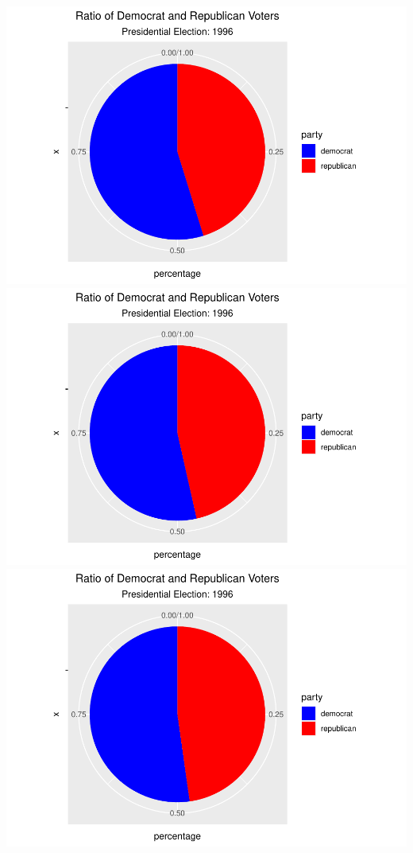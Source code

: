 \documentclass[
]{article}
\begin{document}
\includegraphics{election_files/figure-latex/anim-52.pdf}
\includegraphics{election_files/figure-latex/anim-53.pdf}
\includegraphics{election_files/figure-latex/anim-54.pdf}
\end{document}
